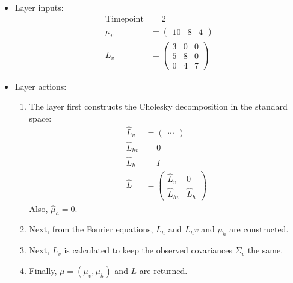 \documentclass[11pt]{article}
\begin{document}
\begin{itemize}
\item Layer inputs:
	\begin{equation}
	\begin{split}
	\text{Timepoint} &= 2 \\
	\mu_v &= \begin{pmatrix}
		10 & 8 & 4
	\end{pmatrix} \\
	L_v &= \begin{pmatrix}
		3 & 0 & 0 \\
		5 & 8 & 0 \\
		0 & 4 & 7
	\end{pmatrix}
	\end{split}
	\end{equation}

\item Layer actions:
	\begin{enumerate}
	\item The layer first constructs the Cholesky decomposition in the standard space:
		\begin{equation}
		\begin{split}
		\hat{L}_v &= \begin{pmatrix}
			...
		\end{pmatrix} \\
		\hat{L}_{hv} &= 0 \\
		\hat{L}_h &= I \\
		\hat{L} &= \begin{pmatrix}
			\hat{L}_v & 0 \\
			\hat{L}_{hv} & \hat{L}_h
		\end{pmatrix}
		\end{split}
		\end{equation}
		Also, $\hat{\mu}_h = 0$.
	
	\item Next, from the Fourier equations, $L_h$ and $L_hv$ and $\mu_h$ are constructed.
	
	\item Next, $L_v$ is calculated to keep the observed covariances $\Sigma_v$ the same.
	
	\item Finally, $\mu = (\mu_v, \mu_h)$ and $L$ are returned.
	\end{enumerate}

\end{itemize}
\end{document}
